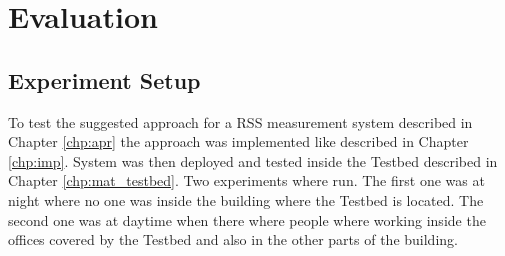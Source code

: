 \chapter{Evaluation}






\section{Experiment Setup}
To test the suggested approach for a RSS measurement system described in Chapter \ref{chp:apr} the approach was implemented like described in Chapter \ref{chp:imp}. System was then deployed and tested inside the Testbed described in Chapter \ref{chp:mat_testbed}. Two experiments where run. The first one was at night where no one was inside the building where the Testbed is located. The second one was at daytime when there where people where working inside the offices covered by the Testbed and also in the other parts of the building. 

